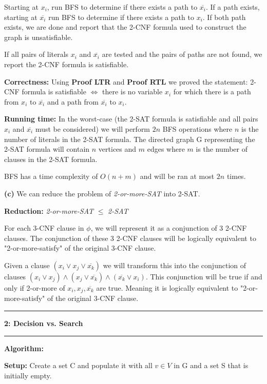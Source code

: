 \documentclass[11pt]{article}
\newcommand\question[2]{\vspace{.25in}\hrule\textbf{#1: #2}\vspace{.5em}\hrule\vspace{.10in}}
\renewcommand\part[1]{\vspace{.10in}\textbf{(#1)}}
\newcommand\algorith{\vspace{.10in}\textbf{Algorithm: }}
\newcommand\correctness{\vspace{.10in}\textbf{Correctness: }}
\newcommand\runtime{\vspace{.10in}\textbf{Running time: }}
\begin{document}
	Starting at $x_i$, run BFS to determine if there exists a path to $\overline{x_i}$. If a path exists, starting at $\overline{x_i}$ run BFS to determine if there exists a path to $x_i$. If both path exists, we are done and report that the 2-CNF formula used to construct the graph is unsatisfiable.
	
	If all pairs of literals $x_i$ and $\overline{x_i}$ are tested and the pairs of paths are not found, we report the 2-CNF formula is satisfiable.
	
\correctness Using \textbf{Proof LTR} and \textbf{Proof RTL} we proved the statement: 2-CNF formula is satisfiable $\iff$ there is no variable $x_i$ for which there is a path from $x_i$ to $\overline{x_i}$ and a path from $\overline{x_i}$ to $x_i$.

\runtime In the worst-case (the 2-SAT formula is satisfiable and all pairs $x_i$ and $\overline{x_i}$ must be considered) we will perform $2n$ BFS operations where $n$ is the number of literals in the 2-SAT formula. The directed graph G representing the 2-SAT formula will contain $n$ vertices and $m$ edges where $m$ is the number of clauses in the 2-SAT formula.

	BFS has a time complexity of $O(n + m)$ and will be ran at most $2n$ times.
	

\part{c} We can reduce the problem of \textit{2-or-more-SAT} into 2-SAT.

\textbf{Reduction:} \textit{2-or-more-SAT} $\leq$ \textit{2-SAT}

For each 3-CNF clause in $\phi$, we will represent it as a conjunction of 3 2-CNF clauses. The conjunction of these 3 2-CNF clauses will be logically equivalent to "2-or-more-satisfy" of the original 3-CNF clause.

Given a clause $(x_i \lor x_j \lor \overline{x_k})$ we will transform this into the conjunction of clauses $(x_i \lor x_j) \land (x_j \lor \overline{x_k}) \land (\overline{x_k} \lor x_i)$. This conjunction will be true if and only if 2-or-more of $x_i, x_j, \overline{x_k}$ are true. Meaning it is logically equivalent to "2-or-more-satisfy" of the original 3-CNF clause.

\question{2}{Decision vs. Search}

\algorith 

\textbf{Setup:} Create a set C and populate it with all $v \in V$ in G and a set S that is initially empty. 
\end{document}
